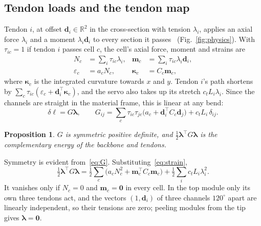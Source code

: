 \documentclass[conference]{IEEEtran}
\newtheorem{proposition}{Proposition}
\newcommand{\dl}{\delta\bm{\ell}}
\newcommand{\lam}{\bm{\lambda}}
\newcommand{\R}{\mathbb{R}}
\begin{document}
\subsection{Tendon loads and the tendon map}
Tendon $i$, at offset $\bm d_i\in\R^2$ in the cross-section with tension $\lambda_i$, applies an axial force $\lambda_i$
and a moment $\lambda_i\bm d_i$ to every section it passes~\cite{camarillo2008,rucker2011} (Fig.~\ref{fig:physics}).
With $\tau_{ic}=1$ if tendon $i$ passes cell $c$, the cell's axial force, moment and strains are
\begin{equation}
\begin{aligned}
N_c&=\textstyle\sum_i\tau_{ic}\lambda_i, &\bm m_c&=\textstyle\sum_i\tau_{ic}\lambda_i\bm d_i,\\
\varepsilon_c&=a_cN_c, &\bm\kappa_c&=C_c\bm m_c,
\end{aligned}
\label{eq:strain}
\end{equation}
where $\bm\kappa_c$ is the integrated curvature towards $x$ and $y$. Tendon $i$'s path shortens by
$\sum_c\tau_{ic}(\varepsilon_c+\bm d_i^\top\bm\kappa_c)$, and the servo also takes up its stretch $c_tL_i\lambda_i$.
Since the channels are straight in the material frame, this is linear at any bend:
\begin{equation}
\dl=G\lam,\qquad G_{ij}=\sum_c\tau_{ic}\tau_{jc}\big(a_c+\bm d_i^\top C_c\bm d_j\big)+c_tL_i\,\delta_{ij}.
\label{eq:G}
\end{equation}

\begin{proposition}\label{prop:spd}
$G$ is symmetric positive definite, and $\frac12\lam^\top G\lam$ is the complementary energy of the backbone and tendons.
\end{proposition}
\begin{IEEEproof}
Symmetry is evident from~\eqref{eq:G}. Substituting~\eqref{eq:strain},
\begin{equation}
\tfrac12\lam^\top G\lam=\tfrac12\sum_c\big(a_cN_c^2+\bm m_c^\top C_c\bm m_c\big)+\tfrac12\sum_i c_tL_i\lambda_i^2 .
\label{eq:energy}
\end{equation}
It vanishes only if $N_c=0$ and $\bm m_c=\bm 0$ in every cell. In the top module only its own three tendons act, and
the vectors $(1,\bm d_i)$ of three channels $120^\circ$ apart are linearly independent, so their tensions are zero;
peeling modules from the tip gives $\lam=\bm 0$.
\end{IEEEproof}
\end{document}
